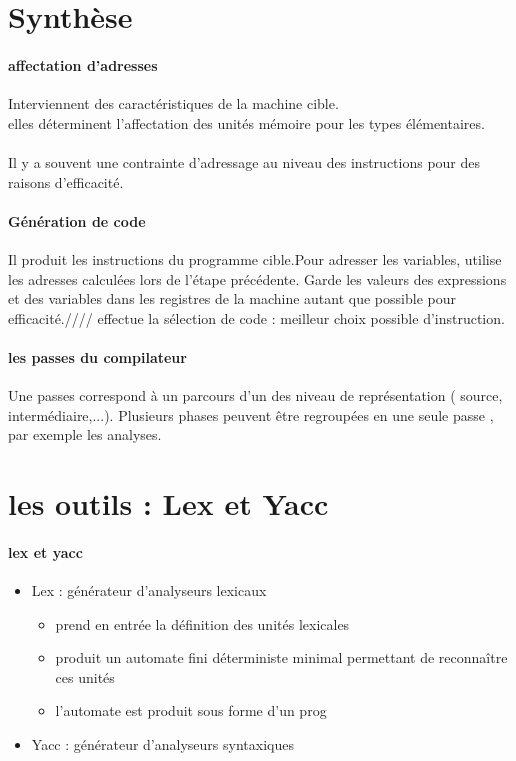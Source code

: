 \documentclass{article}
\begin{document}
\section{Synthèse}
\paragraph{affectation d'adresses}
Interviennent des caractéristiques de la machine cible.\\ elles déterminent l'affectation des unités mémoire pour les types élémentaires.\\\\Il y a souvent une contrainte d'adressage au niveau des instructions pour des raisons d'efficacité.
\paragraph{Génération de code}Il produit les instructions du programme cible.Pour adresser les variables, utilise les adresses calculées lors de l'étape précédente. Garde les valeurs des expressions et des variables dans les registres de la machine autant que possible pour efficacité.//// effectue la sélection de code : meilleur choix possible d'instruction.

\paragraph{les passes du compilateur}
Une passes correspond à un parcours d'un des niveau de représentation ( source, intermédiaire,...). Plusieurs phases peuvent être regroupées en une seule passe , par exemple les analyses.
\newpage
\section{les outils : Lex et Yacc}
\paragraph{lex et yacc}
\begin{itemize}
\item Lex : générateur d'analyseurs lexicaux
\begin{itemize}
 \item prend en entrée la définition des unités lexicales
 \item produit un automate fini déterministe minimal permettant de reconnaître ces unités
 \item l'automate est produit sous forme d'un prog 
\end{itemize}
\item Yacc : générateur d'analyseurs syntaxiques
\end{itemize}
\end{document}

